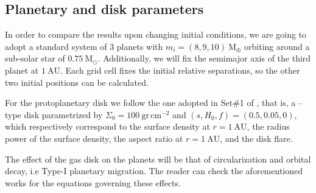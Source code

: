 \documentclass[baaa]{baaa}
\begin{document}
\subsection{Planetary and disk parameters}
\label{subsec:estandar:param}

In order to compare the results upon changing initial conditions, we are going to adopt a standard system of 3 planets with $m_i=(8,9,10)~\mathrm{M_\oplus}$ orbiting around a sub-solar star of $0.75~\mathrm{M_{\odot}}$.
Additionally, we will fix the semimajor axis of the third planet at $1~\mathrm{AU}$. 
Each grid cell fixes the initial relative separations, so the other two initial positions can be calculated.


For the protoplanetary disk we follow the one adopted in Set\#1 of \cite{cerioni.beauge.2023}, that is, a \cite{tanaka.ward.2004} --type disk parametrized by $\Sigma_0=100~\mathrm{gr\,cm^{-2}}$ and $(s,H_0,f) = (0.5,0.05,0)$, which respectively correspond to the surface density at $r=1~\mathrm{AU}$, the radius power of the surface density, the aspect ratio at $r=1~\mathrm{AU}$, and the disk flare.


The effect of the gas disk on the planets will be that of circularization and orbital decay, i.e Type-I planetary migration.
The reader can check the aforementioned works for the equations governing these effects.

\end{document}
